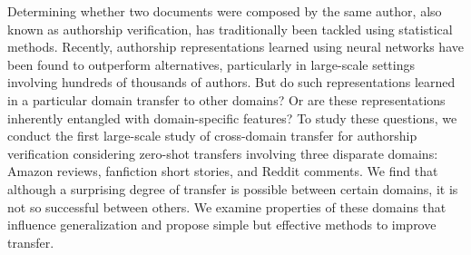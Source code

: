 Determining whether two documents were composed by the same author, also known as authorship verification, has traditionally been tackled using statistical methods. Recently, authorship representations learned using neural networks have been found to outperform alternatives, particularly in large-scale settings involving hundreds of thousands of authors. But do such representations learned in a particular domain transfer to other domains? Or are these representations inherently entangled with domain-specific features? To study these questions, we conduct the first large-scale study of cross-domain transfer for authorship verification considering zero-shot transfers involving three disparate domains: Amazon reviews, fanfiction short stories, and Reddit comments. We find that although a surprising degree of transfer is possible between certain domains, it is not so successful between others. We examine properties of these domains that influence generalization and propose simple but effective methods to improve transfer.
